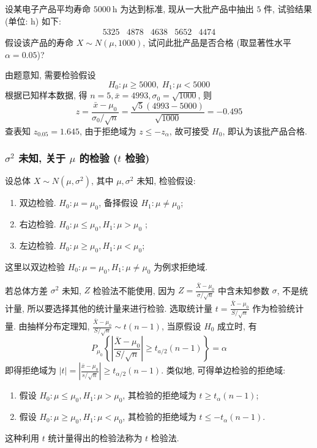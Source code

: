 \begin{example}
    设某电子产品平均寿命 $ 5000 \mathrm{~h} $ 为达到标准, 现从一大批产品中抽出 $5$ 件, 试验结果 (单位: h) 如下:
    $$\begin{array}{lllll}
            5325 & 4878 & 4638 & 5652 & 4474
        \end{array}$$
    假设该产品的寿命 $ X \sim N(\mu, 1000)$, 试问此批产品是否合格 (取显著性水平 $ \alpha=0.05$)?
\end{example}
\begin{solution}
    由题意知, 需要检验假设
    $$H_0:\mu\geqslant 5000,~H_1:\mu<5000$$
    根据已知样本数据, 得 $ n=5, \bar{x}=4993, \sigma_{0}=\sqrt{1000} $, 则
    $$z=\frac{\bar{x}-\mu_{0}}{\sigma_{0} / \sqrt{n}}=\frac{\sqrt{5}(4993-5000)}{\sqrt{1000}}=-0.495$$
    查表知 $ z_{0.05}=1.645 $, 由于拒绝域为 $ z \leqslant-z_{\alpha}$, 故可接受 $ H_{0}$, 即认为该批产品合格.
\end{solution}

\subsubsection{\texorpdfstring{$\sigma^2$}. 未知, 关于 \texorpdfstring{$\mu$}. 的检验 (\texorpdfstring{$t$}. 检验)}

设总体 $ X \sim N\left(\mu, \sigma^{2}\right) $, 其中 $ \mu, \sigma^{2} $ 未知, 检验假设:
\begin{enumerate}[label=(\arabic{*})]
    \item 双边检验. $ H_{0}: \mu=\mu_{0} $, 备择假设 $ H_{1}: \mu \neq \mu_{0} $;
    \item 右边检验. $ H_{0}: \mu \leqslant \mu_{0}, H_{1}: \mu>\mu_{0}$ ;
    \item 左边检验. $ H_{0}: \mu \geqslant \mu_{0}, H_{1}: \mu<\mu_{0} $;
\end{enumerate}
这里以双边检验 $ H_{0}: \mu=\mu_{0}, H_{1}: \mu \neq \mu_{0} $ 为例求拒绝域.

若总体方差 $ \sigma^{2} $ 未知, $Z $ 检验法不能使用, 因为 $\displaystyle Z=\frac{\bar{X}-\mu_{0}}{\sigma / \sqrt{n}} $ 中含未知参数 $\sigma$, 不是统计量, 所以要选择其他的统计量来进行检验.
选取统计量 $\displaystyle t=\frac{\bar{X}-\mu_{0}}{S / \sqrt{n}} $ 作为检验统计量.
由抽样分布定理知, $\displaystyle\frac{\bar{X}-\mu_{0}}{S / \sqrt{n}} \sim t(n-1)$, 当原假设 $ H_{0} $ 成立时, 有
$$P_{\mu_{0}}\left\{\left|\frac{\bar{X}-\mu_{0}}{S / \sqrt{n}}\right| \geqslant t_{a / 2}(n-1)\right\}=\alpha$$
即得拒绝域为 $\displaystyle |t|=\left|\frac{\bar{x}-\mu_{0}}{s / \sqrt{n}}\right| \geqslant t_{\alpha / 2}(n-1)$. 
类似地, 可得单边检验的拒绝域:
\begin{enumerate}[label=(\arabic{*})]
    \item 假设 $ H_{0}: \mu \leqslant \mu_{0}, H_{1}: \mu>\mu_{0}$, 其检验的拒绝域为 $ t \geqslant t_{\alpha}(n-1) $;
    \item 假设 $ H_{0}: \mu \geqslant \mu_{0}, H_{1}: \mu<\mu_{0}$, 其检验的拒绝域为 $ t \leqslant-t_{\alpha}(n-1) $.
\end{enumerate}
这种利用 $ t $ 统计量得出的检验法称为 $ t $ 检验法.

